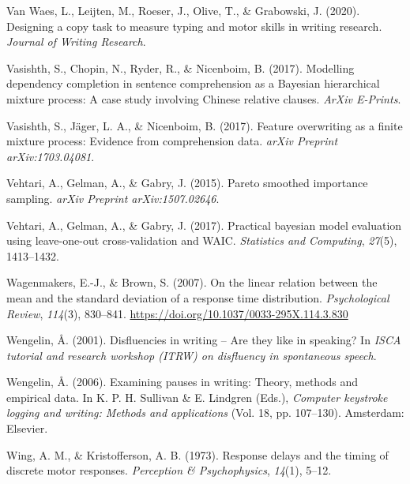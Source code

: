\documentclass[english,jou,floatsintext]{apa7}
\begin{document}
\leavevmode\hypertarget{ref-waes2019}{}%
Van Waes, L., Leijten, M., Roeser, J., Olive, T., \& Grabowski, J. (2020). Designing a copy task to measure typing and motor skills in writing research. \emph{Journal of Writing Research}.

\leavevmode\hypertarget{ref-vasishth2017}{}%
Vasishth, S., Chopin, N., Ryder, R., \& Nicenboim, B. (2017). Modelling dependency completion in sentence comprehension as a Bayesian hierarchical mixture process: A case study involving Chinese relative clauses. \emph{ArXiv E-Prints}.

\leavevmode\hypertarget{ref-vasishth2017feature}{}%
Vasishth, S., Jäger, L. A., \& Nicenboim, B. (2017). Feature overwriting as a finite mixture process: Evidence from comprehension data. \emph{arXiv Preprint arXiv:1703.04081}.

\leavevmode\hypertarget{ref-vehtari2015pareto}{}%
Vehtari, A., Gelman, A., \& Gabry, J. (2015). Pareto smoothed importance sampling. \emph{arXiv Preprint arXiv:1507.02646}.

\leavevmode\hypertarget{ref-vehtari2017practical}{}%
Vehtari, A., Gelman, A., \& Gabry, J. (2017). Practical bayesian model evaluation using leave-one-out cross-validation and WAIC. \emph{Statistics and Computing}, \emph{27}(5), 1413--1432.

\leavevmode\hypertarget{ref-wagenmakers2007linear}{}%
Wagenmakers, E.-J., \& Brown, S. (2007). On the linear relation between the mean and the standard deviation of a response time distribution. \emph{Psychological Review}, \emph{114}(3), 830--841. \url{https://doi.org/10.1037/0033-295X.114.3.830}

\leavevmode\hypertarget{ref-wengelin2001disfluencies}{}%
Wengelin, Å. (2001). Disfluencies in writing -- Are they like in speaking? In \emph{ISCA tutorial and research workshop (ITRW) on disfluency in spontaneous speech}.

\leavevmode\hypertarget{ref-wen06}{}%
Wengelin, Å. (2006). Examining pauses in writing: Theory, methods and empirical data. In K. P. H. Sullivan \& E. Lindgren (Eds.), \emph{Computer keystroke logging and writing: Methods and applications} (Vol. 18, pp. 107--130). Amsterdam: Elsevier.

\leavevmode\hypertarget{ref-wing1973response}{}%
Wing, A. M., \& Kristofferson, A. B. (1973). Response delays and the timing of discrete motor responses. \emph{Perception \& Psychophysics}, \emph{14}(1), 5--12.
\end{document}

